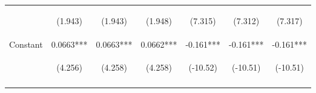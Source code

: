 \documentclass{standalone}
\begin{document}
\begin{tabular}{lcccccc}
    \vspace{4pt}     & \begin{footnotesize}(1.943)\end{footnotesize}   & \begin{footnotesize}(1.943)\end{footnotesize}   & \begin{footnotesize}(1.948)\end{footnotesize}   & \begin{footnotesize}(7.315)\end{footnotesize}  & \begin{footnotesize}(7.312)\end{footnotesize}  & \begin{footnotesize}(7.317)\end{footnotesize}  \\
    Constant         & 0.0663***                                       & 0.0663***                                       & 0.0662***                                       & -0.161***                                      & -0.161***                                      & -0.161***                                      \\
                     & \begin{footnotesize}(4.256)\end{footnotesize}   & \begin{footnotesize}(4.258)\end{footnotesize}   & \begin{footnotesize}(4.258)\end{footnotesize}   & \begin{footnotesize}(-10.52)\end{footnotesize} & \begin{footnotesize}(-10.51)\end{footnotesize} & \begin{footnotesize}(-10.51)\end{footnotesize} \\
    \vspace{4pt}     & \begin{footnotesize}\end{footnotesize}          & \begin{footnotesize}\end{footnotesize}          & \begin{footnotesize}\end{footnotesize}          & \begin{footnotesize}\end{footnotesize}         & \begin{footnotesize}\end{footnotesize}         & \begin{footnotesize}\end{footnotesize}         \\

\end{tabular}
\end{document}
